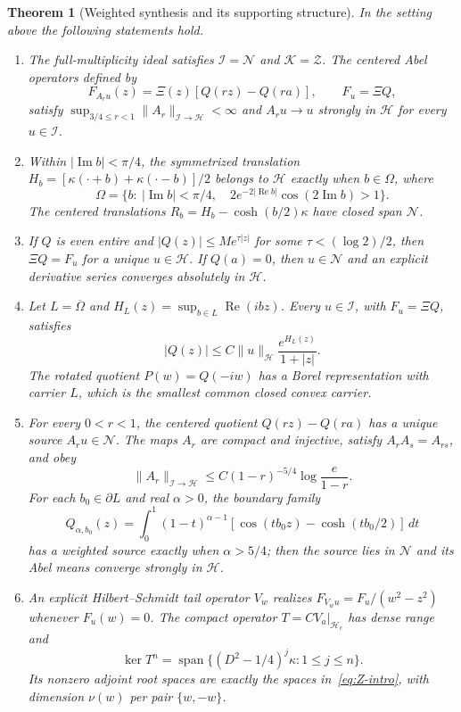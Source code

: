 \documentclass[11pt,a4paper]{article}
\numberwithin{equation}{section}
\newtheorem{theorem}{Theorem}[section]
\theoremstyle{definition}
\theoremstyle{remark}
\newcommand{\Hh}{\mathcal H}
\newcommand{\Nn}{\mathcal N}
\newcommand{\Ii}{\mathcal I}
\newcommand{\Zz}{\mathcal Z}
\newcommand{\Kk}{\mathcal K}
\newcommand{\norm}[1]{\lVert #1\rVert}
\begin{document}
\begin{theorem}[Weighted synthesis and its supporting structure]\label{thm:overview}
In the setting above the following statements hold.
\begin{enumerate}
 \item The full-multiplicity ideal satisfies $\Ii=\Nn$ and $\Kk=\Zz$.
 The centered Abel operators defined by
 \[
 F_{A_ru}(z)=\Xi(z)[Q(rz)-Q(ra)],\qquad F_u=\Xi Q,
 \]
 satisfy $\sup_{3/4\le r<1}\norm{A_r}_{\Ii\to\Hh}<\infty$ and
 $A_ru\to u$ strongly in $\Hh$ for every $u\in\Ii$.
 \item Within $|\operatorname{Im}b|<\pi/4$, the symmetrized translation
 $H_b=[\kappa(\cdot+b)+\kappa(\cdot-b)]/2$ belongs to $\Hh$ exactly when $b\in\Omega$, where
 \begin{equation}\label{eq:lens-intro}
 \Omega=\{b:\ |\operatorname{Im}b|<\pi/4,\quad 2e^{-2|\operatorname{Re}b|}\cos(2\operatorname{Im}b)>1\}.
 \end{equation}
 The centered translations $R_b=H_b-\cosh(b/2)\kappa$ have closed span $\Nn$.
 \item If $Q$ is even entire and $|Q(z)|\le M e^{\tau|z|}$ for some
 $\tau<(\log2)/2$, then $\Xi Q=F_u$ for a unique $u\in\Hh$. If $Q(a)=0$, then $u\in\Nn$ and an explicit derivative series converges absolutely in $\Hh$.
 \item Let $L=\overline\Omega$ and $H_L(z)=\sup_{b\in L}\operatorname{Re}(ibz)$.
 Every $u\in\Ii$, with $F_u=\Xi Q$, satisfies
 \[
 |Q(z)|\le C\norm{u}_{\Hh}\frac{e^{H_L(z)}}{1+|z|}.
 \]
 The rotated quotient $P(w)=Q(-iw)$ has a Borel representation with carrier $L$, which is the smallest common closed convex carrier.
 \item For every $0<r<1$, the centered quotient $Q(rz)-Q(ra)$ has a unique source $A_ru\in\Nn$. The maps $A_r$ are compact and injective, satisfy $A_rA_s=A_{rs}$, and obey
 \[
 \norm{A_r}_{\Ii\to\Hh}\le C(1-r)^{-5/4}\log\frac e{1-r}.
 \]
 For each $b_0\in\partial L$ and real $\alpha>0$, the boundary family
 \[
 Q_{\alpha,b_0}(z)=\int_0^1(1-t)^{\alpha-1}
 [\cos(tb_0z)-\cosh(tb_0/2)]\,dt
 \]
 has a weighted source exactly when $\alpha>5/4$; then the source lies in $\Nn$ and its Abel means converge strongly in $\Hh$.
 \item An explicit Hilbert--Schmidt tail operator $V_w$ realizes
 $F_{V_wu}=F_u/(w^2-z^2)$ whenever $F_u(w)=0$. The compact operator
 $T=CV_a|_{\Hh_c}$ has dense range and
 \[
 \ker T^n=\operatorname{span}\{(D^2-1/4)^j\kappa:1\le j\le n\}.
 \]
 Its nonzero adjoint root spaces are exactly the spaces in~\eqref{eq:Z-intro}, with dimension $\nu(w)$ per pair $\{w,-w\}$.

\end{enumerate}
\end{theorem}
\end{document}
